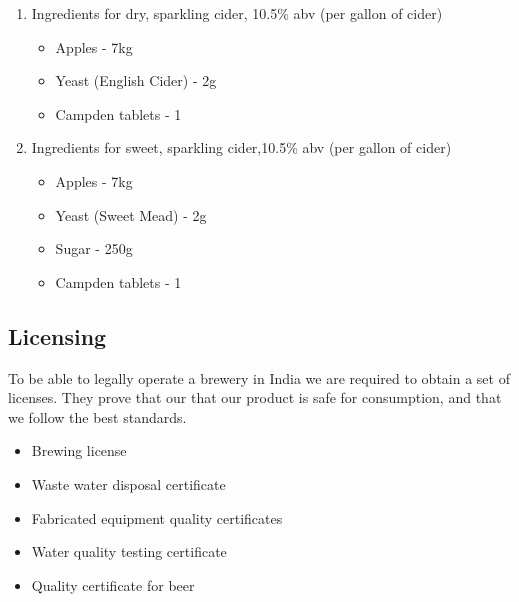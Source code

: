 \documentclass{article}
\begin{document}
		\begin{enumerate}
			\item Ingredients for dry, sparkling cider, 10.5\% abv (per gallon of cider) \\
				\begin{itemize}
					\item Apples - 7kg \\
					\item Yeast (English Cider) - 2g \\
					\item Campden tablets - 1 \\
				\end{itemize}

			\item Ingredients for sweet, sparkling cider,10.5\% abv (per gallon of cider) \\
				\begin{itemize}
					\item Apples - 7kg \\
					\item Yeast (Sweet Mead) - 2g \\
					\item Sugar - 250g \\
					\item Campden tablets - 1 \\
				\end{itemize}
			\end{enumerate}


  \subsection{Licensing}
	To be able to legally operate a brewery in India we are required to obtain a set of licenses. They prove that our that our product is safe for consumption, and that we follow the best standards.\\
	\begin{itemize}
		\item Brewing license \\
		\item Waste water disposal certificate \\
		\item Fabricated equipment quality certificates \\
		\item Water quality testing certificate \\
		\item Quality certificate for beer \\
	\end{itemize}
\end{document}
